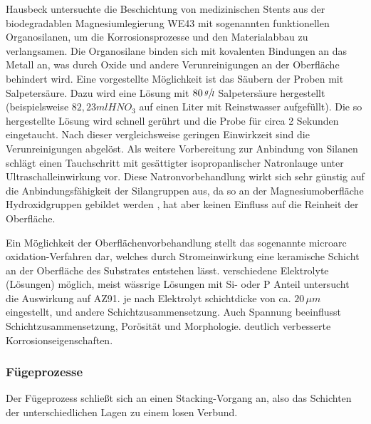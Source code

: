 Hausbeck \cite{Hausbeck.2012} untersuchte die Beschichtung von medizinischen Stents aus der biodegradablen Magnesiumlegierung WE43 mit sogenannten funktionellen Organosilanen, um die Korrosionsprozesse und den Materialabbau zu verlangsamen. Die Organosilane binden sich mit kovalenten Bindungen an das Metall an, was durch Oxide und andere Verunreinigungen an der Oberfläche behindert wird. Eine vorgestellte Möglichkeit ist das Säubern der Proben mit Salpetersäure. Dazu wird eine Lösung mit $80\, \sfrac{g}{l}$ Salpetersäure hergestellt (beispielsweise $82,23 ml HNO_3$ auf einen Liter mit Reinstwasser aufgefüllt). Die so hergestellte Lösung wird schnell gerührt und die Probe für circa 2 Sekunden eingetaucht. Nach dieser vergleichsweise geringen Einwirkzeit sind die Verunreinigungen abgelöst. Als weitere Vorbereitung zur Anbindung von Silanen schlägt \cite{Hausbeck.2012} einen Tauchschritt mit gesättigter isopropanlischer Natronlauge unter Ultraschalleinwirkung vor. Diese Natronvorbehandlung wirkt sich sehr günstig auf die Anbindungsfähigkeit der Silangruppen aus, da so an der Magnesiumoberfläche Hydroxidgruppen gebildet werden \cite{Hausbeck.2012,Gou.2004}, hat aber keinen Einfluss auf die Reinheit der Oberfläche.

Ein Möglichkeit der Oberflächenvorbehandlung stellt das sogenannte microarc oxidation-Verfahren dar, welches durch Stromeinwirkung eine keramische Schicht an der Oberfläche des Substrates entstehen lässt. 
verschiedene Elektrolyte (Lösungen) möglich, meist wässrige Lösungen mit Si- oder P Anteil
\cite{Cai.2006} untersucht die Auswirkung auf AZ91. je nach Elektrolyt schichtdicke von ca. $20 \, \mu m$ eingestellt, und andere Schichtzusammensetzung. Auch Spannung beeinflusst Schichtzusammensetzung, Porösität und Morphologie.
deutlich verbesserte Korrosionseigenschaften.



\subsubsection{Fügeprozesse}

Der Fügeprozess schließt sich an einen Stacking-Vorgang an, also das Schichten der unterschiedlichen Lagen zu einem losen Verbund. 


